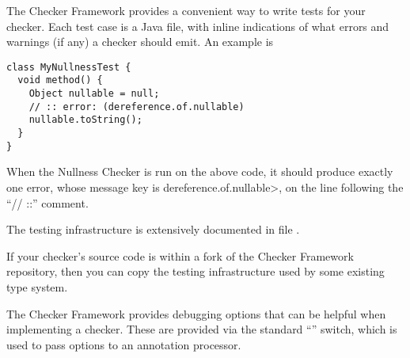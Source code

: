 
The Checker Framework provides a convenient way to write tests for your
checker.  Each test case is a Java file, with inline indications of what
errors and warnings (if any) a checker should emit.  An example is

\begin{Verbatim}
class MyNullnessTest {
  void method() {
    Object nullable = null;
    // :: error: (dereference.of.nullable)
    nullable.toString();
  }
}
\end{Verbatim}

\noindent
When the Nullness Checker is run on the above code, it should produce
exactly one error, whose message key is \<dereference.of.nullable>, on
the line following the ``// ::'' comment.

The testing infrastructure is extensively documented in file .

If your checker's source code is within a fork of the Checker Framework
repository, then you can copy the testing infrastructure used by some
existing type system.



The Checker Framework provides debugging options that can be helpful when
implementing a checker. These are provided via the standard  ``''
switch, which is used to pass options to an annotation processor.




